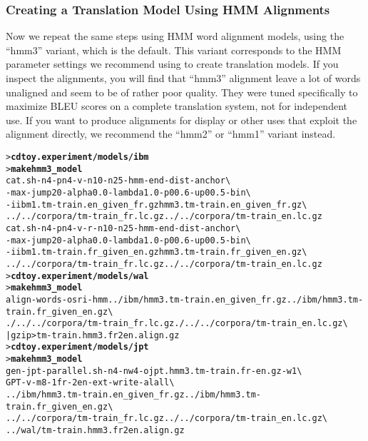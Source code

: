 \documentclass[11pt,letterpaper]{article}
\newcommand{\bs}{\textbackslash{}}
\begin{document}
\subsubsection{Creating a Translation Model Using HMM Alignments} \label{HMM}

Now we repeat the same steps using HMM word alignment models, using the
``hmm3'' variant, which is the default.  This variant corresponds to the HMM
parameter settings we recommend using to create translation models.  If you
inspect the alignments, you will find that ``hmm3'' alignment leave a lot of
words unaligned and seem to be of rather poor quality.  They were tuned
specifically to maximize BLEU scores on a complete translation system, not for
independent use.  If you want to produce alignments for display or other uses
that exploit the alignment directly, we recommend the ``hmm2'' or ``hmm1''
variant instead.

\begin{small}
\begin{alltt}
   > \textbf{cd toy.experiment/models/ibm}
   > \textbf{make hmm3_model}
   cat.sh -n 4 -pn 4 -v -n1 0 -n2 5 -hmm -end-dist -anchor \bs
      -max-jump 20 -alpha 0.0 -lambda 1.0 -p0 0.6 -up0 0.5 -bin \bs
      -i ibm1.tm-train.en_given_fr.gz hmm3.tm-train.en_given_fr.gz \bs
      ../../corpora/tm-train_fr.lc.gz ../../corpora/tm-train_en.lc.gz
   cat.sh -n 4 -pn 4 -v -r -n1 0 -n2 5 -hmm -end-dist -anchor \bs
      -max-jump 20 -alpha 0.0 -lambda 1.0 -p0 0.6 -up0 0.5 -bin \bs
      -i ibm1.tm-train.fr_given_en.gz hmm3.tm-train.fr_given_en.gz \bs
      ../../corpora/tm-train_fr.lc.gz ../../corpora/tm-train_en.lc.gz
   > \textbf{cd toy.experiment/models/wal}
   > \textbf{make hmm3_model}
   align-words -o sri -hmm ../ibm/hmm3.tm-train.en_given_fr.gz ../ibm/hmm3.tm-train.fr_given_en.gz \bs
      ./../../corpora/tm-train_fr.lc.gz ./../../corpora/tm-train_en.lc.gz \bs
      | gzip > tm-train.hmm3.fr2en.align.gz
   > \textbf{cd toy.experiment/models/jpt}
   > \textbf{make hmm3_model}
   gen-jpt-parallel.sh -n 4 -nw 4 -o jpt.hmm3.tm-train.fr-en.gz -w 1 \bs
      GPT -v -m 8 -1 fr -2 en -ext -write-al all \bs
      ../ibm/hmm3.tm-train.en_given_fr.gz ../ibm/hmm3.tm-train.fr_given_en.gz \bs
      ../../corpora/tm-train_fr.lc.gz ../../corpora/tm-train_en.lc.gz \bs
      ../wal/tm-train.hmm3.fr2en.align.gz
\end{alltt}
\end{small}
\end{document}
